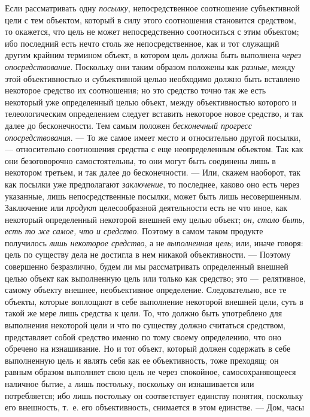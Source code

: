\documentclass[twoside]{article}
\begin{document}
{{{{Если рассматривать одну
{\em посылку},
непосредственное соотношение субъективной цели с тем
объектом, который в силу этого соотношения становится средством, то
окажется, что цель не может непосредственно соотноситься с этим объектом;
ибо последний есть нечто столь же непосредственное, как и тот служащий
другим крайним термином объект, в котором цель должна быть выполнена
{\em через опосредствование}.
Поскольку они таким образом положены как
{\em разные}, между этой
объективностью и субъективной целью необходимо должно быть вставлено
некоторое средство их соотношения; но это средство точно так же есть
некоторый уже определенный целью объект, между объективностью которого и
телеологическим определением следует вставить некоторое новое средство, и
так далее до бесконечности. Тем самым положен
{\em бесконечный прогресс}
{\em опосредствования}. —
То же самое имеет место и относительно другой
посылки, — относительно соотношения средства с еще
неопределенным объектом. Так как они безоговорочно самостоятельны, то они
могут быть соединены лишь в некотором третьем, и так далее до
бесконечности. — Или, скажем наоборот, так как посылки уже
предполагают {\em заключение},
то последнее, каково оно есть через указанные, лишь
непосредственные посылки, может быть лишь несовершенным. Заключение или
{\em продукт}
целесообразной деятельности есть не что иное, как некоторый
определенный некоторой внешней ему целью объект;
{\em он, стало быть, есть то же самое,
что и средство}. Поэтому в самом таком продукте получилось
{\em лишь некоторое средство},
а не {\em выполненная
цель}; или, иначе говоря: цель по существу дела не достигла
в нем никакой объективности. — Поэтому совершенно
безразлично, будем ли мы рассматривать определенный внешней целью объект
как выполненную цель или только как средство; это
—~релятивное, самому объекту внешнее, необъективное
определение. Следовательно, все те объекты, которые воплощают в себе
выполнение некоторой внешней цели, суть в такой же мере лишь средства к
цели. То, что должно быть употреблено для выполнения некоторой цели и что
по существу должно считаться средством, представляет собой средство именно
по тому своему определению, что оно обречено на изнашивание. Но и тот
объект, который должен содержать в себе выполненную цель и являть себя как
ее объективность, тоже преходящ; он равным образом выполняет свою цель не
через спокойное, самосохраняющееся наличное бытие, а лишь постольку,
поскольку он изнашивается или потребляется; ибо лишь постольку он
соответствует единству понятия, поскольку его внешность, т.~е. его
объективность, снимается в этом единстве. — Дом, часы
}}}}
\end{document}

